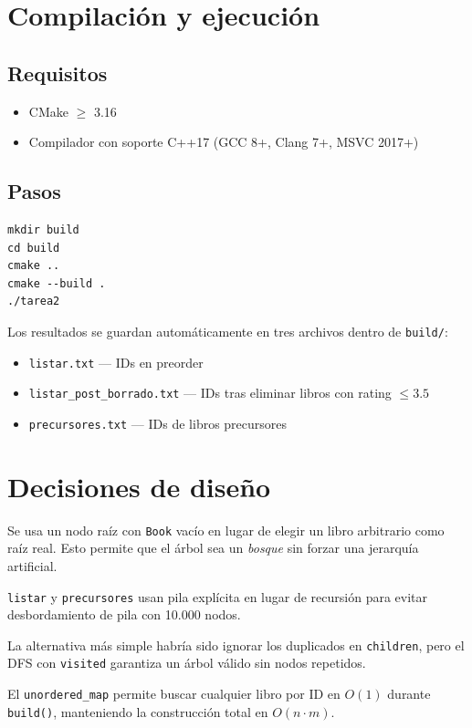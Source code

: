 \documentclass[12pt, a4paper]{article}
\begin{document}
\section{Compilación y ejecución}

\subsection{Requisitos}
\begin{itemize}
    \item CMake $\geq$ 3.16
    \item Compilador con soporte C++17 (GCC 8+, Clang 7+, MSVC 2017+)
\end{itemize}

\subsection{Pasos}
\begin{verbatim}
mkdir build
cd build
cmake ..
cmake --build .
./tarea2
\end{verbatim}

Los resultados se guardan automáticamente en tres archivos dentro de \texttt{build/}:
\begin{itemize}
    \item \texttt{listar.txt} — IDs en preorder
    \item \texttt{listar\_post\_borrado.txt} — IDs tras eliminar libros con rating $\leq 3.5$
    \item \texttt{precursores.txt} — IDs de libros precursores
\end{itemize}

\section{Decisiones de diseño}

\begin{description}[style=nextline]
    \item[Raíz virtual]
    Se usa un nodo raíz con \texttt{Book} vacío en lugar de elegir un libro arbitrario
    como raíz real. Esto permite que el árbol sea un \textit{bosque} sin forzar una
    jerarquía artificial.

    \item[Recorridos iterativos]
    \texttt{listar} y \texttt{precursores} usan pila explícita en lugar de recursión
    para evitar desbordamiento de pila con 10.000 nodos.

    \item[DFS para romper ciclos]
    La alternativa más simple habría sido ignorar los duplicados en \texttt{children},
    pero el DFS con \texttt{visited} garantiza un árbol válido sin nodos repetidos.

    \item[Tabla hash para construcción]
    El \texttt{unordered\_map} permite buscar cualquier libro por ID en $O(1)$ durante
    \texttt{build()}, manteniendo la construcción total en $O(n \cdot m)$.
\end{description}
\end{document}
